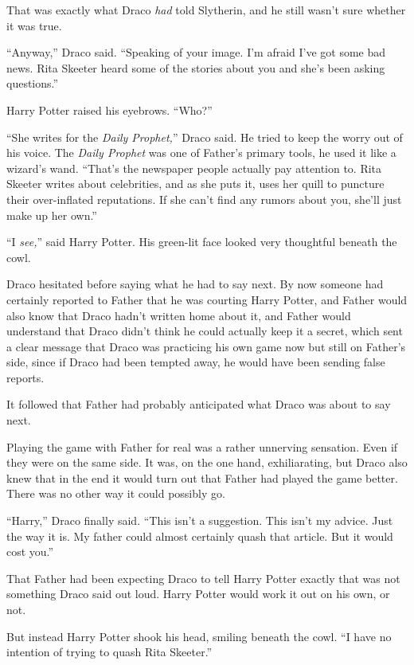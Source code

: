 That was exactly what Draco \emph{had} told Slytherin, and he still
wasn't sure whether it was true.

``Anyway,'' Draco said. ``Speaking of your image. I'm afraid I've got
some bad news. Rita Skeeter heard some of the stories about you and
she's been asking questions.''

Harry Potter raised his eyebrows. ``Who?''

``She writes for the \emph{Daily Prophet,}'' Draco said. He tried to
keep the worry out of his voice. The \emph{Daily Prophet} was one of
Father's primary tools, he used it like a wizard's wand. ``That's the
newspaper people actually pay attention to. Rita Skeeter writes about
celebrities, and as she puts it, uses her quill to puncture their
over-inflated reputations. If she can't find any rumors about you,
she'll just make up her own.''

``I \emph{see,}'' said Harry Potter. His green-lit face looked very
thoughtful beneath the cowl.

Draco hesitated before saying what he had to say next. By now someone
had certainly reported to Father that he was courting Harry Potter, and
Father would also know that Draco hadn't written home about it, and
Father would understand that Draco didn't think he could actually keep
it a secret, which sent a clear message that Draco was practicing his
own game now but still on Father's side, since if Draco had been tempted
away, he would have been sending false reports.

It followed that Father had probably anticipated what Draco was about to
say next.

Playing the game with Father for real was a rather unnerving sensation.
Even if they were on the same side. It was, on the one hand,
exhiliarating, but Draco also knew that in the end it would turn out
that Father had played the game better. There was no other way it could
possibly go.

``Harry,'' Draco finally said. ``This isn't a suggestion. This isn't my
advice. Just the way it is. My father could almost certainly quash that
article. But it would cost you.''

That Father had been expecting Draco to tell Harry Potter exactly that
was not something Draco said out loud. Harry Potter would work it out on
his own, or not.

But instead Harry Potter shook his head, smiling beneath the cowl. ``I
have no intention of trying to quash Rita Skeeter.''

